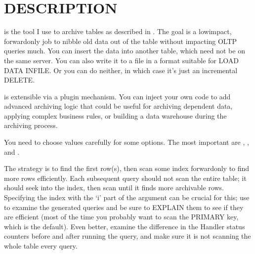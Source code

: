 \documentclass[letterpaper,10pt,english]{sphinxmanual}
\begin{document}
\section{DESCRIPTION}
\label{\detokenize{mariadb-archiver:description}}
\sphinxAtStartPar
{} is the tool I use to archive tables as described in
.  The goal is a low\sphinxhyphen{}impact, forward\sphinxhyphen{}only
job to nibble old data out of the table without impacting OLTP queries much.
You can insert the data into another table, which need not be on the same
server.  You can also write it to a file in a format suitable for LOAD DATA
INFILE.  Or you can do neither, in which case it’s just an incremental DELETE.

\sphinxAtStartPar
{} is extensible via a plugin mechanism.  You can inject your own
code to add advanced archiving logic that could be useful for archiving
dependent data, applying complex business rules, or building a data warehouse
during the archiving process.

\sphinxAtStartPar
You need to choose values carefully for some options.  The most important are
{\hyperref[\detokenize{mariadb-archiver:cmdoption-mariadb-archiver-limit}]{}}, {\hyperref[\detokenize{mariadb-archiver:cmdoption-mariadb-archiver-retries}]{}}, and {\hyperref[\detokenize{mariadb-archiver:cmdoption-mariadb-archiver-txn-size}]{}}.

\sphinxAtStartPar
The strategy is to find the first row(s), then scan some index forward\sphinxhyphen{}only to
find more rows efficiently.  Each subsequent query should not scan the entire
table; it should seek into the index, then scan until it finds more archivable
rows.  Specifying the index with the ‘i’ part of the {\hyperref[\detokenize{mariadb-archiver:cmdoption-mariadb-archiver-source}]{}} argument can
be crucial for this; use {\hyperref[\detokenize{mariadb-archiver:cmdoption-mariadb-archiver-dry-run}]{}} to examine the generated queries and be
sure to EXPLAIN them to see if they are efficient (most of the time you probably
want to scan the PRIMARY key, which is the default).  Even better, examine the
difference in the Handler status counters before and after running the query,
and make sure it is not scanning the whole table every query.
\end{document}
